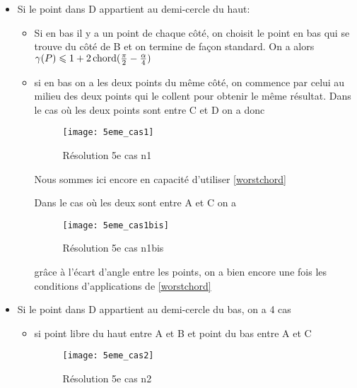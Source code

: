 \begin{itemize}

\item \label{5cas1} Si le point dans D appartient au demi-cercle du haut:

\begin{itemize}

\item \label{5cas11} Si en bas il y a un point de chaque côté, on choisit le point en bas qui se trouve du côté de B et on termine de façon standard. On a alors $\gamma(P) \leqslant 1 + 2\operatorname{chord}(\frac{\pi}{2} - \frac{\alpha}{4})$

\item \label{5cas12} si en bas on a les deux points du même côté, on commence par celui au milieu des deux points qui le collent pour obtenir le même résultat.
Dans le cas où les deux points sont entre C et D on a donc

\begin{figure}[h!]
  \centering
  \texttt{[image: 5eme\_cas1]}
  \caption{Résolution 5e cas n1}
  \label{fig:5eme_cas1}
\end{figure}

Nous sommes ici encore en capacité d'utiliser \ref{worstchord}

\label{5cas13} Dans le cas où les deux sont entre A et C on a

\begin{figure}[h!]
  \centering
  \texttt{[image: 5eme\_cas1bis]}
  \caption{Résolution 5e cas n1bis}
  \label{fig:5eme_cas1bis}
\end{figure}

grâce à l'écart d'angle entre les points, on a bien encore une fois les conditions d'applications de \ref{worstchord}

\end{itemize}

\item \label{5cas2} Si le point dans D appartient au demi-cercle du bas, on a 4 cas

\begin{itemize}

\item \label{5cas21} si point libre du haut entre A et B et point du bas entre A et C

\begin{figure}[h!]
  \centering
  \texttt{[image: 5eme\_cas2]}
  \caption{Résolution 5e cas n2}
  \label{fig:5eme_cas2}
\end{figure}


\end{itemize}
\end{itemize}
